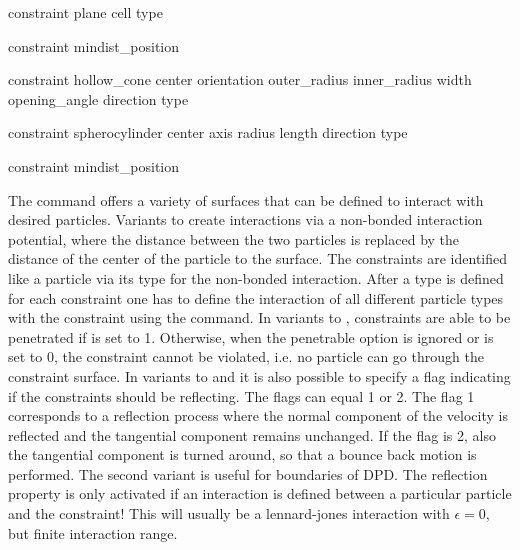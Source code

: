 \begin{essyntax}
  constraint plane cell    
  type 

  constraint mindist_position   

  constraint hollow_cone center    orientation   
  outer_radius  inner_radius  width  opening_angle  direction  
  type   

  constraint spherocylinder center    
  axis    
  radius  length  
  direction  
  type    

  constraint mindist_position    

  \begin{features}
  \end{features}
\end{essyntax}

The  command offers a variety of surfaces that can
be defined to interact with desired particles. Variants  to
 create interactions via a non-bonded interaction
potential, where the distance between the two particles is replaced by
the distance of the center of the particle to the surface. The
constraints are identified like a particle via its type for the
non-bonded interaction.  After a type is defined for each constraint
one has to define the interaction of all different particle types with
the constraint using the  command. In variants
 to , constraints are able to be penetrated if
 is set to 1. Otherwise, when the penetrable option is
ignored or  is set to 0, the constraint cannot be violated,
i.e. no particle can go through the constraint surface.  In variants
 to  and  it is also possible to
specify a flag indicating if the constraints should be reflecting. The
flags can equal 1 or 2.  The flag 1 corresponds to a reflection
process where the normal component of the velocity is reflected and
the tangential component remains unchanged. If the flag is 2, also the
tangential component is turned around, so that a bounce back motion is
performed. The second variant is useful for boundaries of DPD.  The
reflection property is only activated if an interaction is defined
between a particular particle and the constraint! This will usually be
a lennard-jones interaction with $\epsilon=0$, but finite interaction
range.

